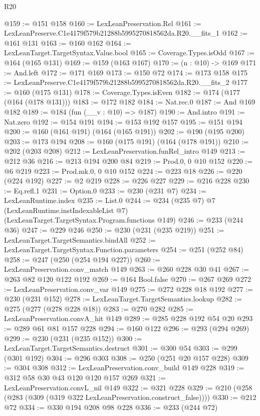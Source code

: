 \begin{lexlean}{R20}
\begin{coremodule}
@159 := @151 @158
@160 := LexLeanPreservation.Rel
@161 := LexLeanPreserve.C1e4179f579b21288b5995270818562da.R20.__fits_1
@162 := @161 @131
@163 := @160 @162
@164 := LexLeanTarget.TargetSyntax.Value.bool
@165 := Coverage.Types.isOdd
@167 := @164 (@165 @131)
@169 := @159 (@163 @167)
@170 := (n : @10) -> @169
@171 := And.left
@172 := @171 @169
@173 := @150 @72
@174 := @173 @158
@175 := LexLeanPreserve.C1e4179f579b21288b5995270818562da.R20.__fits_2
@177 := @160 (@175 @131)
@178 := Coverage.Types.isEven
@182 := @174 (@177 (@164 (@178 @131)))
@183 := @172 @182
@184 := Nat.rec.{0}
@187 := And @169 @182
@189 := @184 (fun (__v : @10) => @187)
@190 := And.intro
@191 := Nat.zero
@192 := @154 @191
@194 := @153 @192 @157
@195 := @151 @194
@200 := @160 (@161 @191) (@164 (@165 @191))
@202 := @190 (@195 @200)
@203 := @173 @194
@208 := @160 (@175 @191) (@164 (@178 @191))
@210 := @202 (@203 @208)
@212 := LexLeanPreservation.funRel_intro @149
@213 := @212 @36
@216 := @213 @194 @200 @84
@219 := Prod.{0, 0} @10 @152
@220 := @6 @219
@223 := Prod.mk.{0, 0} @10 @152
@224 := @223 @18
@226 := @220 (@224 @192)
@227 := @2 @219
@228 := @226 @227
@229 := @216 @228
@230 := Eq.refl.{1}
@231 := Option.{0}
@233 := @230 (@231 @7)
@234 := LexLeanRuntime.index
@235 := List.{0}
@244 := @234
    (@235 @7)
    @7
    (LexLeanRuntime.instIndexableList @7)
    (LexLeanTarget.TargetSyntax.Program.functions @149)
@246 := @233 (@244 @36)
@247 := @229 @246
@250 := @230 (@231 (@235 @219))
@251 := LexLeanTarget.TargetSemantics.bindAll
@252 := LexLeanTarget.TargetSyntax.Function.parameters
@254 := @251 (@252 @84)
@258 := @247 (@250 (@254 @194 @227))
@260 := LexLeanPreservation.conv_match @149
@263 := @260 @228 @30 @41
@267 := @263 @82 @120 @122 @192
@269 := @164 Bool.false
@270 := @267 @269
@272 := LexLeanPreservation.conv_var @149
@275 := @272 @228 @18 @192
@277 := @230 (@231 @152)
@278 := LexLeanTarget.TargetSemantics.lookup
@282 := @275 (@277 (@278 @228 @18))
@283 := @270 @282
@285 := LexLeanPreservation.convA_hit @149
@289 := @285 @228 @192 @54 @20
@293 := @289 @61 @81 @157 @228
@294 := @160 @122
@296 := @293 (@294 @269)
@299 := @230 (@231 (@235 @152))
@300 := LexLeanTarget.TargetSemantics.destruct
@301 := @300 @54
@303 := @299 (@301 @192)
@304 := @296 @303
@308 := @250 (@251 @20 @157 @228)
@309 := @304 @308
@312 := LexLeanPreservation.conv_build @149 @228
@319 := @312 @58 @30 @43 @120 @120 @157 @269
@321 := LexLeanPreservation.convL_nil @149
@322 := @321 @228
@329 := @210 (@258 (@283 (@309 (@319 @322 LexLeanPreservation.construct_false))))
@330 := @212 @72
@334 := @330 @194 @208 @98 @228
@336 := @233 (@244 @72)

\end{coremodule}
\end{lexlean}
